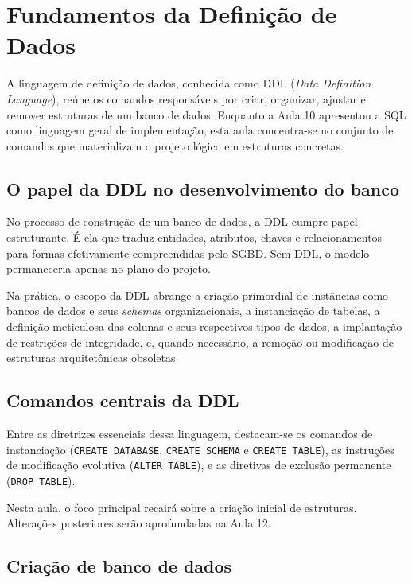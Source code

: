 \chapter{Fundamentos da Definição de Dados}
\label{cap:fundamentos_definicao_dados}

A linguagem de definição de dados, conhecida como DDL (\textit{Data Definition Language}), reúne os comandos responsáveis por criar, organizar, ajustar e remover estruturas de um banco de dados. Enquanto a Aula 10 apresentou a SQL como linguagem geral de implementação, esta aula concentra-se no conjunto de comandos que materializam o projeto lógico em estruturas concretas.

\section{O papel da DDL no desenvolvimento do banco}

No processo de construção de um banco de dados, a DDL cumpre papel estruturante. É ela que traduz entidades, atributos, chaves e relacionamentos para formas efetivamente compreendidas pelo SGBD. Sem DDL, o modelo permaneceria apenas no plano do projeto.

Na prática, o escopo da DDL abrange a criação primordial de instâncias como bancos de dados e seus \textit{schemas} organizacionais, a instanciação de tabelas, a definição meticulosa das colunas e seus respectivos tipos de dados, a implantação de restrições de integridade, e, quando necessário, a remoção ou modificação de estruturas arquitetônicas obsoletas.

\section{Comandos centrais da DDL}

Entre as diretrizes essenciais dessa linguagem, destacam-se os comandos de instanciação (\texttt{CREATE DATABASE}, \texttt{CREATE SCHEMA} e \texttt{CREATE TABLE}), as instruções de modificação evolutiva (\texttt{ALTER TABLE}), e as diretivas de exclusão permanente (\texttt{DROP TABLE}).

Nesta aula, o foco principal recairá sobre a criação inicial de estruturas. Alterações posteriores serão aprofundadas na Aula 12.

\section{Criação de banco de dados}

